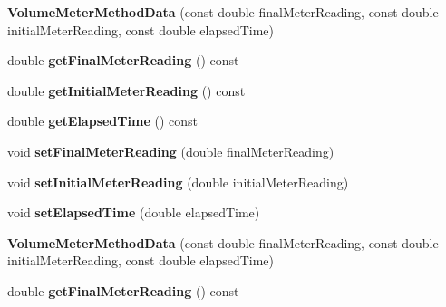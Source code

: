 \begin{DoxyCompactItemize}
\mbox{\label{class_volume_meter_method_data_a9bedae0d1c80b0fe40bd74e0fa1bbf2c}} 
{\bfseries Volume\+Meter\+Method\+Data} (const double final\+Meter\+Reading, const double initial\+Meter\+Reading, const double elapsed\+Time)
\item 
\mbox{\label{class_volume_meter_method_data_a6b1580eee08d323a1cb70650c519470b}} 
double {\bfseries get\+Final\+Meter\+Reading} () const
\item 
\mbox{\label{class_volume_meter_method_data_a1dce034a5b5018b3dfb888d4d8f0c69e}} 
double {\bfseries get\+Initial\+Meter\+Reading} () const
\item 
\mbox{\label{class_volume_meter_method_data_a6551ffb2db97c7158cf19ac3908e5007}} 
double {\bfseries get\+Elapsed\+Time} () const
\item 
\mbox{\label{class_volume_meter_method_data_a0502a308919b685c68bcfbaab0922a53}} 
void {\bfseries set\+Final\+Meter\+Reading} (double final\+Meter\+Reading)
\item 
\mbox{\label{class_volume_meter_method_data_a7d2aae1eba1dc115caded2cb6b7bd9a5}} 
void {\bfseries set\+Initial\+Meter\+Reading} (double initial\+Meter\+Reading)
\item 
\mbox{\label{class_volume_meter_method_data_a41cf3174466d024c8dab4a1f5705a779}} 
void {\bfseries set\+Elapsed\+Time} (double elapsed\+Time)
\item 
\mbox{\label{class_volume_meter_method_data_a9bedae0d1c80b0fe40bd74e0fa1bbf2c}} 
{\bfseries Volume\+Meter\+Method\+Data} (const double final\+Meter\+Reading, const double initial\+Meter\+Reading, const double elapsed\+Time)
\item 
\mbox{\label{class_volume_meter_method_data_a6b1580eee08d323a1cb70650c519470b}} 
double {\bfseries get\+Final\+Meter\+Reading} () const
\item 
\mbox{\label{class_volume_meter_method_data_a1dce034a5b5018b3dfb888d4d8f0c69e}} 

\end{DoxyCompactItemize}
